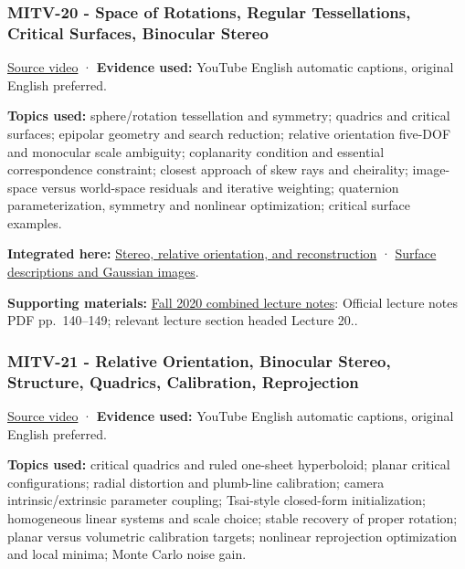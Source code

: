 \subsubsection{MITV-20 - Space of Rotations, Regular Tessellations, Critical Surfaces, Binocular Stereo}\label{04-visual-computing-ii-ch036-mitv-20---space-of-rotations-regular-tessellations-critical-surfaces-binocular-stereo}

\href{https://www.youtube.com/watch?v=Mcy-LlcD8jI}{Source video} · \textbf{Evidence used:} YouTube English automatic captions, original English preferred.

\textbf{Topics used:} sphere/rotation tessellation and symmetry; quadrics and critical surfaces; epipolar geometry and search reduction; relative orientation five-DOF and monocular scale ambiguity; coplanarity condition and essential correspondence constraint; closest approach of skew rays and cheirality; image-space versus world-space residuals and iterative weighting; quaternion parameterization, symmetry and nonlinear optimization; critical surface examples.

\textbf{Integrated here:} \hyperref[04-visual-computing-ii-ch032-stereo-relative-orientation-and-reconstruction]{Stereo, relative orientation, and reconstruction} · \hyperref[04-visual-computing-ii-ch032-surface-descriptions-and-gaussian-images]{Surface descriptions and Gaussian images}.

\textbf{Supporting materials:} \href{https://ocw.mit.edu/courses/6-801-machine-vision-fall-2020/9ec44f69e72995c370b3797818ba01e6_MIT6_801F20_lectureNotes.pdf}{Fall 2020 combined lecture notes}: Official lecture notes PDF pp.~140--149; relevant lecture section headed Lecture 20..

\subsubsection{MITV-21 - Relative Orientation, Binocular Stereo, Structure, Quadrics, Calibration, Reprojection}\label{04-visual-computing-ii-ch036-mitv-21---relative-orientation-binocular-stereo-structure-quadrics-calibration-reprojection}

\href{https://www.youtube.com/watch?v=-n0cXgPSwOw}{Source video} · \textbf{Evidence used:} YouTube English automatic captions, original English preferred.

\textbf{Topics used:} critical quadrics and ruled one-sheet hyperboloid; planar critical configurations; radial distortion and plumb-line calibration; camera intrinsic/extrinsic parameter coupling; Tsai-style closed-form initialization; homogeneous linear systems and scale choice; stable recovery of proper rotation; planar versus volumetric calibration targets; nonlinear reprojection optimization and local minima; Monte Carlo noise gain.

